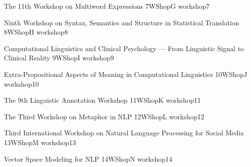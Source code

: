 \begin{wsschedule}
  {The 11th Workshop on Multiword Expressions}
  {7}{WShopG}
  {workshop7}
  {\WShopLocG}
  
\end{wsschedule}

\begin{wsschedule}
  {Ninth Workshop on Syntax, Semantics and Structure in Statistical Translation}
  {8}{WShopH}
  {workshop8}
  {\WShopLocH}
  
\end{wsschedule}



\begin{wsschedule}
  {Computational Linguistics and Clinical Psychology — From Linguistic Signal to Clinical Reality}
  {9}{WShopI}
  {workshop9}
  {\WShopLocI}
  
\end{wsschedule}

\begin{wsschedule}
  {Extra-Propositional Aspects of Meaning in Computational Linguistics}
  {10}{WShopJ}
  {workshop10}
  {\WShopLocJ}
  
\end{wsschedule}

\begin{wsschedule}
  {The 9th Linguistic Annotation Workshop}
  {11}{WShopK}
  {workshop11}
  {\WShopLocK}
  
\end{wsschedule}

\begin{wsschedule}
  {The Third Workshop on Metaphor in NLP}
  {12}{WShopL}
  {workshop12}
  {\WShopLocL}
  
\end{wsschedule}

\begin{wsschedule}
  {Third International Workshop on Natural Language Processing for Social Media}
  {13}{WShopM}
  {workshop13}
  {\WShopLocM}
  
\end{wsschedule}

\begin{wsschedule}
  {Vector Space Modeling for NLP}
  {14}{WShopN}
  {workshop14}
  {\WShopLocN}
  
\end{wsschedule}

\clearpage{\thispagestyle{emptyheader}\cleardoublepage}
